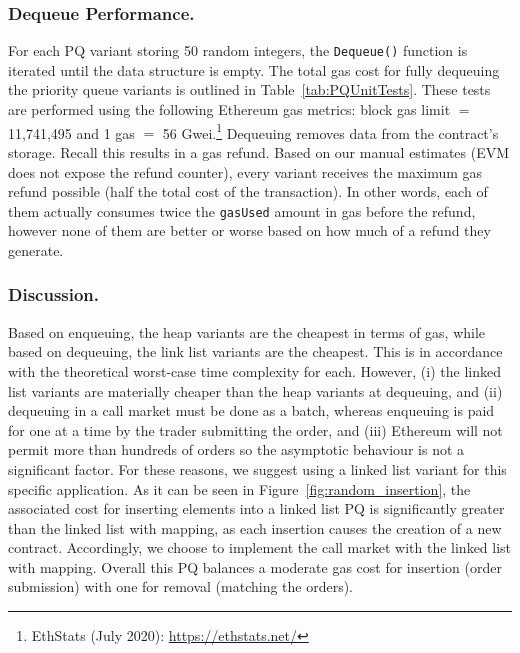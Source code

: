 




\subsubsection{Dequeue Performance.} For each PQ variant storing 50 random integers, the \texttt{Dequeue()} function is iterated until the data structure is empty. The total gas cost for fully dequeuing the priority queue variants is outlined in Table~\ref{tab:PQUnitTests}. These tests are performed using the following Ethereum gas metrics: block gas limit $=$11,741,495 and 1 gas $=$ 56 Gwei.\footnote{EthStats (July 2020): \url{https://ethstats.net/}} Dequeuing removes data from the contract's storage. Recall this results in a gas refund. Based on our manual estimates (EVM does not expose the refund counter), every variant receives the maximum gas refund possible (\ie half the total cost of the transaction). In other words, each of them actually consumes twice the \texttt{gasUsed} amount in gas before the refund, however none of them are better or worse based on how much of a refund they generate.  

\subsubsection{Discussion.} Based on enqueuing, the heap variants are the cheapest in terms of gas, while based on dequeuing, the link list variants are the cheapest. This is in accordance with the theoretical worst-case time complexity for each. However, (i) the linked list variants are materially cheaper than the heap variants at dequeuing, and (ii) dequeuing in a call market must be done as a batch, whereas enqueuing is paid for one at a time by the trader submitting the order, and (iii) Ethereum will not permit more than hundreds of orders so the asymptotic behaviour is not a significant factor. For these reasons, we suggest using a linked list variant for this specific application. As it can be seen in Figure~\ref{fig:random_insertion}, the associated cost for inserting elements into a linked list PQ is significantly greater than the linked list with mapping, as each insertion causes the creation of a new contract. Accordingly, we choose to implement the call market with the linked list with mapping. Overall this PQ balances a moderate gas cost for insertion (\ie order submission) with one for removal (\ie matching the orders). 

